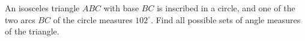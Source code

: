 An isosceles triangle $ABC$ with base $BC$ is inscribed in a circle, and one of the two arcs $BC$ of the circle measures $102^\circ$. Find all possible sets of angle measures of the triangle.
